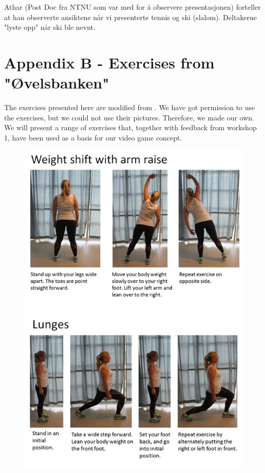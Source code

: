 Athar (Post Doc fra NTNU som var med for å observere presentasjonen) forteller at han observerte ansiktene når vi presenterte 
tennis og ski (slalom). Deltakerne "lyste opp" når ski ble nevnt.

\newpage
\section*{Appendix B - Exercises from "{Ø}velsbanken"}
\label{app:exercises}

The exercises presented here are modified from \cite{eldretrening}. We have got permission to use the exercises, but we could not use their pictures. Therefore, we made our own. We will present a range of exercises that, together with feedback from workshop 1, have been used as a basis for our video game concept.

\begin{figure} [H]
\centering
\includegraphics[scale=0.8]{WeightShift.jpg}
\label{weightshift}
\end{figure} 

